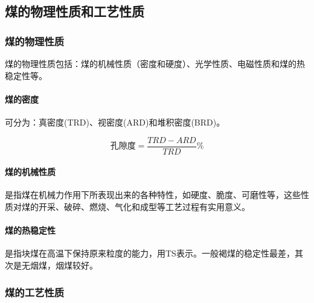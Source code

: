 \documentclass[10pt,openany]{ctexbook}
\begin{document}
\subsection{煤的物理性质和工艺性质}
\subsubsection{煤的物理性质}
煤的物理性质包括：煤的机械性质（密度和硬度）、光学性质、电磁性质和煤的热稳定性等。
\paragraph{煤的密度}
可分为：真密度(TRD)、视密度(ARD)和堆积密度(BRD)。

  $$ \mbox{孔隙度}=\dfrac{TRD-ARD}{TRD}\%$$

\paragraph{煤的机械性质}
是指煤在机械力作用下所表现出来的各种特性，如硬度、脆度、可磨性等，这些性质对煤的开采、破碎、燃烧、气化和成型等工艺过程有实用意义。
\paragraph{煤的热稳定性}  是指块煤在高温下保持原来粒度的能力，用TS表示。一般褐煤的稳定性最差，其次是无烟煤，烟煤较好。
\subsubsection{煤的工艺性质}
\end{document}
